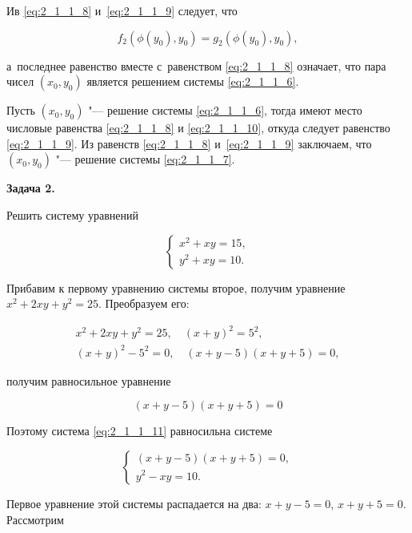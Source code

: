 \begin{enumerate}
Ив \eqref{eq:2_1_1_8} и~\eqref{eq:2_1_1_9} следует, что

\begin{equation}\label{eq:2_1_1_10}
f_{2}(\phi(y_{0}), y_{0}) = g_{2}(\phi(y_{0}), y_{0}),
\end{equation}

а~последнее равенство вместе с~равенством \eqref{eq:2_1_1_8} означает,
что пара чисел $(x_{0}, y_{0})$ является решением системы \eqref{eq:2_1_1_6}.

Пусть $(x_{0}, y_{0})$ "--- решение системы \eqref{eq:2_1_1_6}, тогда
имеют место числовые равенства \eqref{eq:2_1_1_8} и \eqref{eq:2_1_1_10},
откуда следует равенство \eqref{eq:2_1_1_9}.
Из равенств \eqref{eq:2_1_1_8} и~\eqref{eq:2_1_1_9} заключаем, что $(x_{0}, y_{0})$
"--- решение системы \eqref{eq:2_1_1_7}.

\hypertarget{ex:2_1_1_2}{\textbf{Задача 2.}} Решить систему уравнений

\begin{equation}\label{eq:2_1_1_11}
\begin{cases}
x^{2} + xy = 15, \\
y^{2} + xy = 10.
\end{cases}
\end{equation}

Прибавим к первому уравнению системы второе, получим уравнение
$x^{2} + 2xy + y^{2} = 25$. Преобразуем его:

\begin{gather*}
x^{2} + 2xy + y^{2} = 25, \quad (x + y)^{2} = 5^{2}, \\
(x + y)^{2} - 5^{2} = 0, \quad (x + y - 5)(x + y + 5) = 0,
\end{gather*}

получим равносильное уравнение

\begin{equation}\label{eq:2_1_1_12}
(x + y - 5)(x + y + 5) = 0
\end{equation}

Поэтому система \eqref{eq:2_1_1_11} равносильна системе

\begin{equation}\label{eq:2_1_1_13}
\begin{cases}
(x + y - 5)(x + y + 5) = 0, \\
y^{2} - xy = 10.
\end{cases}
\end{equation}

Первое уравнение этой системы распадается на два: $x + y - 5 = 0$,
$x + y + 5 = 0$. Рассмотрим


\end{enumerate}
